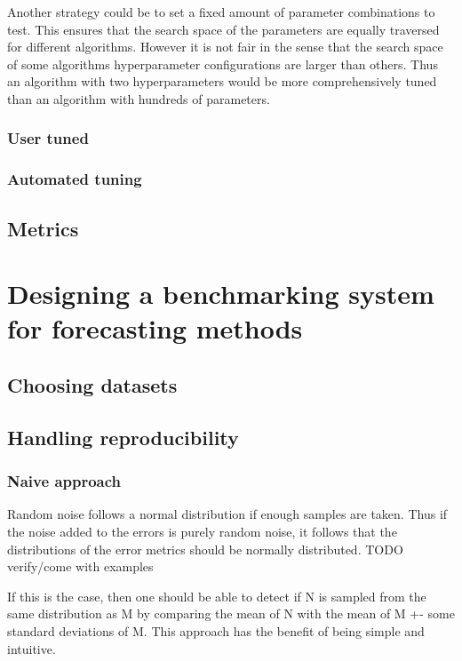 Another strategy could be to set a fixed amount of parameter combinations to test. This ensures that the search space of the parameters are equally traversed for different algorithms. However it is not fair in the sense that the search space of some algorithms hyperparameter configurations are larger than others. Thus an algorithm with two hyperparameters would be more comprehensively tuned than an algorithm with hundreds of parameters.

\subsubsection{User tuned}
\subsubsection{Automated tuning}

\subsection{Metrics}

\section{Designing a benchmarking system for forecasting methods}

\subsection{Choosing datasets}
\subsection{Handling reproducibility}
\subsubsection{Naive approach}
Random noise follows a normal distribution if enough samples are taken. Thus if the noise added to the errors is purely random noise, it follows that the distributions of the error metrics should be normally distributed. TODO verify/come with examples

If this is the case, then one should be able to detect if N is sampled from the same distribution as M by comparing the mean of N with the mean of M +- some standard deviations of M. This approach has the benefit of being simple and intuitive.


